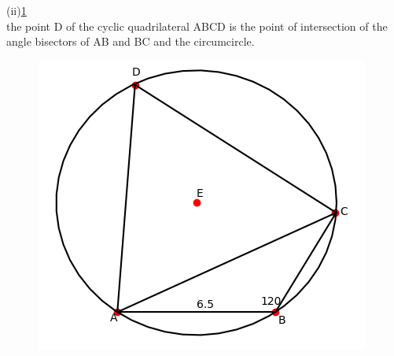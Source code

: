 \documentclass[journal,12pt,twocolumn]{IEEEtran}
\renewcommand\thesection{\arabic{section}}
\begin{document}
\begin{enumerate}[label=\thesection.\arabic*.,ref=\thesection.\theenumi]
(ii)\ref{fig2} \\
the point D of the cyclic quadrilateral ABCD is the point of intersection of the angle 
bisectors of AB and BC and the circumcircle.
\begin{figure}[t!]
\centering
\includegraphics[width = \columnwidth]{fig2.png}\\
\caption{}
\label{fig2}
\end{figure}
\\

\end{enumerate}
\end{document}
